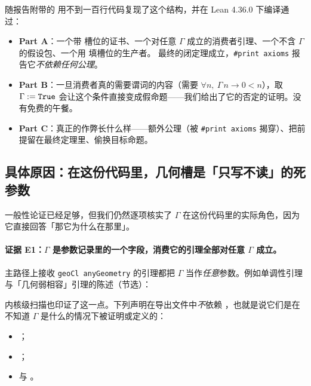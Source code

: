 随报告附带的  用不到一百行代码复现了这个结构，并在 Lean 4.36.0 下编译通过：
\begin{itemize}
\item \textbf{Part A}：一个带  槽位的证书、一个对任意 $\Gamma$ 成立的消费者引理、一个不含 $\Gamma$ 的假设包、一个用  填槽位的生产者。
最终的闭定理成立，\texttt{\#print axioms} 报告它\emph{不依赖任何公理}。
\item \textbf{Part B}：一旦消费者真的需要谓词的内容（需要 $\forall n,\ \Gamma\,n \to 0<n$），取 $\Gamma := \text{\texttt{True}}$ 会让这个条件直接变成假命题——我们给出了它的否定的证明。没有免费的午餐。
\item \textbf{Part C}：真正的作弊长什么样——额外公理（被 \texttt{\#print axioms} 揭穿）、把前提留在最终定理里、偷换目标命题。
\end{itemize}

\subsection{具体原因：在这份代码里，几何槽是「只写不读」的死参数}

一般性论证已经足够，但我们仍然逐项核实了 $\Gamma$ 在这份代码里的实际角色，因为它直接回答「那它为什么在那里」。

\paragraph{证据 E1：$\Gamma$ 是参数记录里的一个字段，消费它的引理全部对任意 $\Gamma$ 成立。}


主路径上接收 \texttt{geoCl anyGeometry} 的引理都把 $\Gamma$ 当作\emph{任意}参数。例如单调性引理与「几何弱相容」引理的陈述（节选）：


内核级扫描也印证了这一点。下列声明在导出文件中\emph{不}依赖 ，也就是说它们是在不知道 $\Gamma$ 是什么的情况下被证明或定义的：
\begin{itemize}
\item {}；
\item {}；
\item {} 与 。
\end{itemize}


